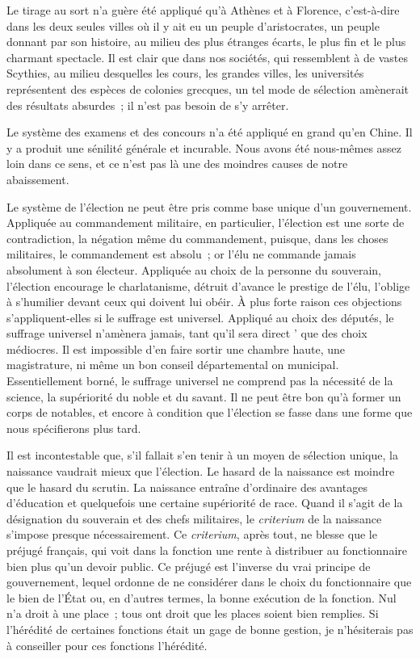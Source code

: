 \documentclass[french,twoside]{book} %
\begin{document}
Le tirage au sort n’a guère été appliqué qu’à Athènes et à Florence, c’est-à-dire dans les deux seules villes où il y ait eu un peuple d’aristocrates, un peuple donnant par son histoire, au milieu des plus étranges écarts, le plus fin et le plus charmant spectacle. Il est clair que dans nos sociétés, qui ressemblent à de vastes Scythies, au milieu desquelles les cours, les grandes villes, les universités représentent des espèces de colonies grecques, un tel mode de sélection amènerait des résultats absurdes ; il n’est pas besoin de s’y arrêter.\par
Le système des examens et des concours n’a été appliqué en grand qu’en Chine. Il y a produit une sénilité générale et incurable. Nous avons été nous-mêmes assez loin dans ce sens, et ce n’est pas là une des moindres causes de notre abaissement.\par
Le système de l’élection ne peut être pris comme base unique d’un gouvernement. Appliquée au commandement militaire, en particulier, l’élection est une sorte de contradiction, la négation même du commandement, puisque, dans les choses militaires, le commandement est absolu ; or l’élu ne commande jamais absolument à son électeur. Appliquée au choix de la personne du souverain, l’élection encourage le charlatanisme, détruit d’avance le prestige de l’élu, l’oblige à s’humilier devant ceux qui doivent lui obéir. À plus forte raison ces objections s’appliquent-elles si le suffrage est universel. Appliqué au choix des députés, le suffrage universel n’amènera jamais, tant qu’il sera direct ’ que des choix médiocres. Il est impossible d’en faire sortir une chambre haute, une magistrature, ni même un bon conseil départemental on municipal. Essentiellement borné, le suffrage universel ne comprend pas la nécessité de la science, la supériorité du noble et du savant. Il ne peut être bon qu’à former un corps de notables, et encore à condition que l’élection se fasse dans une forme que nous spécifierons plus tard.\par
Il est incontestable que, s’il fallait s’en tenir à un moyen de sélection unique, la naissance vaudrait mieux que l’élection. Le hasard de la naissance est moindre que le hasard du scrutin. La naissance entraîne d’ordinaire des avantages d’éducation et quelquefois une certaine supériorité de race. Quand il s’agit de la désignation du souverain et des chefs militaires, le {\itshape criterium} de la naissance s’impose presque nécessairement. Ce {\itshape criterium}, après tout, ne blesse que le préjugé français, qui voit dans la fonction une rente à distribuer au fonctionnaire bien plus qu’un devoir public. Ce préjugé est l’inverse du vrai principe de gouvernement, lequel ordonne de ne considérer dans le choix du fonctionnaire que le bien de l’État ou, en d’autres termes, la bonne exécution de la fonction. Nul n’a droit à une place ; tous ont droit que les places soient bien remplies. Si l’hérédité de certaines fonctions était un gage de bonne gestion, je n’hésiterais pas à conseiller pour ces fonctions l’hérédité.\par
\end{document}
